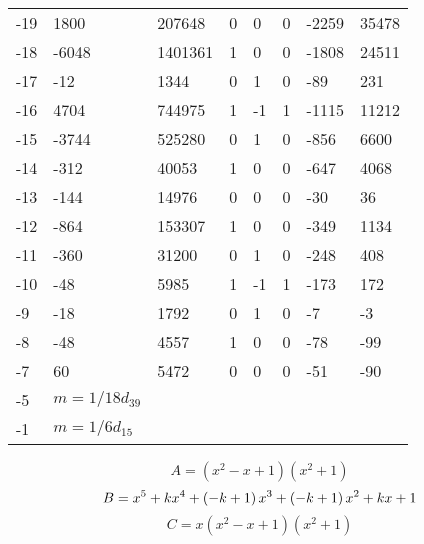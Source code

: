\documentclass{amsart}
\begin{document}
\begin{longtable}{|l|l|l|lllll|}
-19&1800&207648&0&0&0&-2259&35478\\
-18&-6048&1401361&1&0&0&-1808&24511\\
-17&-12&1344&0&1&0&-89&231\\
-16&4704&744975&1&-1&1&-1115&11212\\
-15&-3744&525280&0&1&0&-856&6600\\
-14&-312&40053&1&0&0&-647&4068\\
-13&-144&14976&0&0&0&-30&36\\
-12&-864&153307&1&0&0&-349&1134\\
-11&-360&31200&0&1&0&-248&408\\
-10&-48&5985&1&-1&1&-173&172\\
-9&-18&1792&0&1&0&-7&-3\\
-8&-48&4557&1&0&0&-78&-99\\
-7&60&5472&0&0&0&-51&-90\\
-5&$m=1/18d_{39}$&&\multicolumn{5}{c|}{}\\
-1&$m=1/6d_{15}$&&\multicolumn{5}{c|}{}\\
\hline
\end{longtable}
$$A=(x^2
 - x
 + 1)(x^2
 + 1)$$
$$B=x^5
 + k\*x^4
 + \left(-k
 + 1\right) \*x^3
 + \left(-k
 + 1\right) \*x^2
 + k\*x
 + 1$$
$$C=x(x^2
 - x
 + 1)(x^2
 + 1)$$
\end{document}
